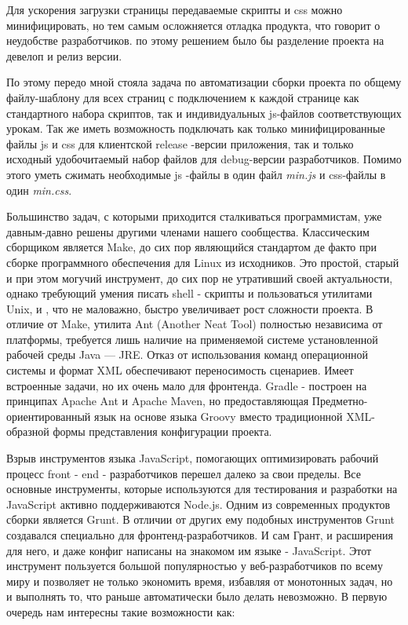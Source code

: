 Для ускорения загрузки страницы передаваемые скрипты и css можно минифицировать, но тем самым осложняется отладка продукта, что говорит о неудобстве разработчиков. по этому решением было бы разделение проекта на девелоп и релиз версии.

По этому передо мной стояла задача по автоматизации сборки проекта по общему файлу-шаблону для всех страниц с подключением к каждой странице как стандартного набора скриптов, так и индивидуальных js-файлов соответствующих урокам. Так же иметь возможность подключать как только минифицированные файлы js и css для клиентской release -версии приложения, так и  только исходный удобочитаемый набор файлов для debug-версии разработчиков. Помимо этого уметь сжимать необходимые js -файлы в один файл \textit{min.js} и css-файлы в один \textit{min.css}.

Большинство задач, с которыми приходится сталкиваться программистам, уже давным-давно решены другими членами нашего сообщества. Классическим сборщиком является Make, до сих пор являющийся стандартом де факто при сборке программного обеспечения для Linux из исходников. Это простой, старый и при этом могучий инструмент, до сих пор не утративший своей актуальности, однако требующий умения писать shell - скрипты и пользоваться утилитами Unix, и , что не маловажно, быстро увеличивает рост сложности проекта. В отличие от Make, утилита Ant (Another Neat Tool)  полностью независима от платформы, требуется лишь наличие на применяемой системе установленной рабочей среды Java — JRE. Отказ от использования команд операционной системы и формат XML обеспечивают переносимость сценариев. Имеет встроенные задачи, но их очень мало для фронтенда. Gradle - построен на принципах Apache Ant и Apache Maven, но предоставляющая Предметно-ориентированный язык на основе языка Groovy вместо традиционной XML-образной формы представления конфигурации проекта.

Взрыв инструментов языка JavaScript, помогающих оптимизировать рабочий процесс front - end - разработчиков  перешел далеко за свои пределы. Все основные инструменты, которые используются для тестирования и разработки на JavaScript активно поддерживаются Node.js. Одним из современных продуктов сборки является Grunt. В отличии от других ему подобных инструментов Grunt создавался специально для фронтенд-разработчиков. И сам Грант, и расширения для него, и даже конфиг написаны на знакомом им языке - JavaScript. Этот инструмент пользуется большой популярностью у веб-разработчиков по всему миру и позволяет не только экономить время, избавляя от монотонных задач, но и выполнять то, что раньше автоматически было делать невозможно. В первую очередь нам интересны такие возможности как:



